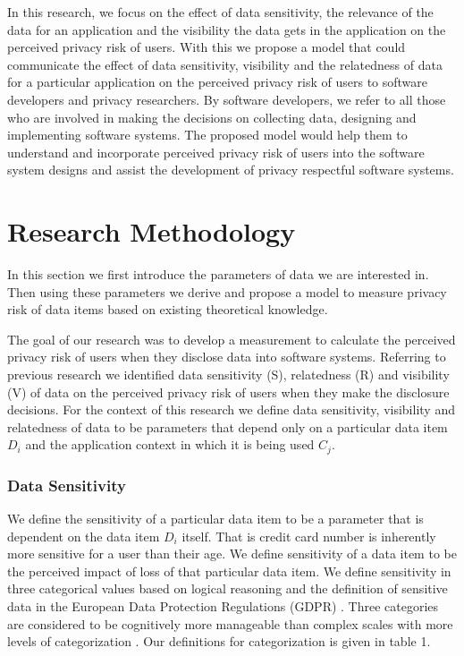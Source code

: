 \documentclass[10pt]{article}
\begin{document}
In this research, we focus on the effect of data sensitivity, the relevance of the data for an application and the visibility the data gets in the application on the perceived privacy risk of users. With this we propose a model that could communicate the effect of data sensitivity, visibility and the relatedness of data for a particular application on the perceived privacy risk of users to software developers and privacy researchers. By software developers, we refer to all those who are involved in making the decisions on collecting data, designing and implementing software systems. The proposed model would help them to understand and incorporate perceived privacy risk of users into the software system designs and assist the development of privacy respectful software systems. 


\section {Research Methodology}

In this section we first introduce the parameters of data we are interested in. Then using these parameters we derive and propose a model to measure privacy risk of data items based on existing theoretical knowledge.

The goal of our research was to develop a measurement to calculate the perceived privacy risk of users when they disclose data into software systems. Referring to previous research we identified data sensitivity (S), relatedness (R) and visibility (V) of data on the perceived privacy risk of users when they make the disclosure decisions. For the context of this research we define data sensitivity, visibility and relatedness of data to be parameters that depend only on a particular data item \textit{$D_i$} and the application context in which it is being used \textit{$C_j$}. 

\subsubsection{Data Sensitivity} 

We define the sensitivity of a particular data item to be a parameter that is dependent on the data item \textit{$D_i$} itself. That is credit card number is inherently more sensitive for a user than their age. We define sensitivity of a data item to be the perceived impact of loss of that particular data item. We define sensitivity in three categorical values based on logical reasoning and the definition of sensitive data in the European Data Protection Regulations (GDPR) \cite {wagner2016national}. Three categories are considered to be cognitively more manageable than complex scales with more levels of categorization \cite {oetzel2014systematic}. Our definitions for categorization is given in table 1.
\end{document}
